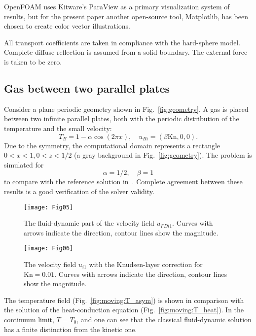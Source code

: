 \documentclass[smallextended]{svjour3} %
\newcommand{\Kn}{\mathrm{Kn}}
\begin{document}
OpenFOAM\textregistered{} uses Kitware's ParaView\textregistered{} as a primary visualization system of results,
but for the present paper another open-source tool, Matplotlib, has been chosen to create color vector illustrations.

All transport coefficients are taken in compliance with the hard-sphere model.
Complete diffuse reflection is assumed from a solid boundary.
The external force is taken to be zero.

\subsection{Gas between two parallel plates}

Consider a plane periodic geometry shown in Fig.~\ref{fig:geometry}.
A gas is placed between two infinite parallel plates,
both with the periodic distribution of the temperature and the small velocity:
\begin{equation}
    T_B = 1-\alpha\cos(2\pi x), \quad u_{Bi} = (\beta\Kn,0,0).
\end{equation}
Due to the symmetry, the computational domain represents a rectangle \(0<x<1, 0<z<1/2\)
(a gray background in Fig.~\ref{fig:geometry}).
The problem is simulated for
\[ \alpha=1/2, \quad \beta = 1 \]
to compare with the reference solution in~\cite{SoneBobylev96}.
Complete agreement between these results is a good verification of the solver validity.

\begin{figure}
    \centering
    \texttt{[image: Fig05]}
    \caption{The fluid-dynamic part of the velocity field \(u_{FDi1}\).
        Curves with arrows indicate the direction, contour lines show the magnitude.}
    \label{fig:moving:fluid}
\end{figure}

\begin{figure}
    \centering
    \texttt{[image: Fig06]}
    \caption{The velocity field \(u_{i1}\) with the Knudsen-layer correction for \(\Kn=0.01\).
        Curves with arrows indicate the direction, contour lines show the magnitude.}
    \label{fig:moving:kn001}
\end{figure}

The temperature field (Fig.~\ref{fig:moving:T_asym}) is shown
in comparison with the solution of the heat-conduction equation (Fig.~\ref{fig:moving:T_heat}).
In the continuum limit, \(T=T_0\), and one can see that the classical fluid-dynamic solution
has a finite distinction from the kinetic one.
\end{document}
